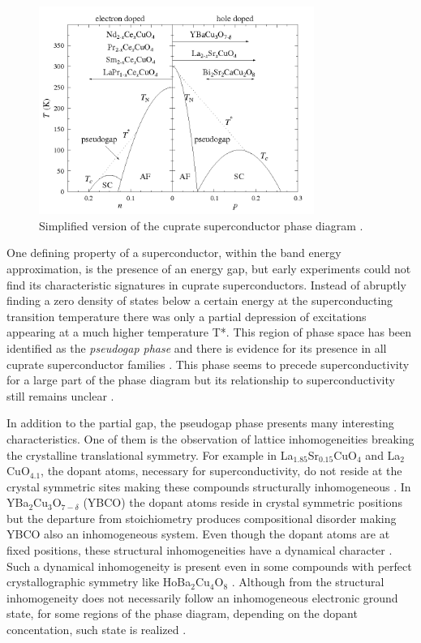 \begin{figure}[ht]
  \centering
  \includegraphics[width=0.8\textwidth]{images/CuPhaseDiag.png}
  \caption[Simplified version of the cuprate superconductor phase diagram]
  {Simplified version of the cuprate superconductor phase diagram \protect\cite{CuPhaseDiag}.}
  \label{fig:CuPhaseDiag}
\end{figure}

One defining property of a superconductor, within the band energy approximation, is the presence of an energy gap, but early experiments could not find its characteristic signatures in cuprate superconductors.
Instead of abruptly finding a zero density of states below a certain energy at the superconducting transition temperature there was only a partial depression of excitations appearing at a much higher temperature T*.
This region of phase space has been identified as the \textit{pseudogap phase} and there is evidence for its presence in all cuprate superconductor families \cite{Timusk1999,Muller2007}.
This phase seems to precede superconductivity for a large part of the phase diagram but its relationship to superconductivity still remains unclear \cite{?}.

In addition to the partial gap, the pseudogap phase presents many interesting characteristics. 
One of them is the observation of lattice inhomogeneities breaking the crystalline translational symmetry.
For example in La$_{1.85}$Sr$_{0.15}$CuO$_{4}$ and La$_{2}$CuO$_{4.1}$, the dopant atoms, necessary for superconductivity, do not reside at the crystal symmetric sites making these compounds structurally inhomogeneous \cite{Poccia2011}.
In YBa$_2$Cu$_3$O$_{7-\delta}$ (YBCO) the dopant atoms reside in crystal symmetric positions but the departure from stoichiometry produces compositional disorder \cite{Chen1988,Andersen1990} making YBCO also an inhomogeneous system.
Even though the dopant atoms are at fixed positions, these structural inhomogeneities have a dynamical character \cite{Mihailovic2005,Bianconi1996}.
Such a dynamical inhomogeneity is present even in some compounds with perfect crystallographic symmetry like HoBa$_{2}$Cu$_{4}$O$_{8}$ \cite{RubioTemprano2000}.
Although from the structural inhomogeneity does not necessarily follow an inhomogeneous electronic ground state, for some regions of the phase diagram, depending on the dopant concentation, such state is realized \cite{?}.


